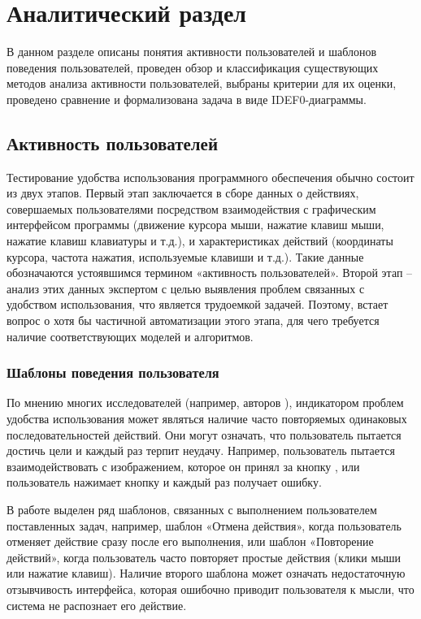 \chapter{Аналитический раздел}
\label{cha:analysis}

В данном разделе
описаны понятия активности пользователей и шаблонов поведения пользователей,
проведен обзор и классификация существующих методов анализа активности пользователей,
выбраны критерии для их оценки, проведено сравнение и формализована задача в виде IDEF0-диаграммы.

\section{Активность пользователей}

Тестирование удобства использования программного обеспечения обычно состоит из двух этапов. Первый этап заключается в сборе данных о действиях, совершаемых пользователями посредством взаимодействия с графическим интерфейсом программы (движение курсора мыши, нажатие клавиш мыши, нажатие клавиш клавиатуры и т.д.), и характеристиках действий (координаты курсора, частота нажатия, используемые клавиши и т.д.). Такие данные обозначаются устоявшимся термином «активность пользователей». Второй этап – анализ этих данных экспертом с целью выявления проблем связанных с удобством использования, что является трудоемкой задачей. Поэтому, встает вопрос о хотя бы частичной автоматизации этого этапа, для чего требуется наличие соответствующих моделей и алгоритмов.

\subsection{Шаблоны поведения пользователя}
По мнению многих исследователей (например, авторов \cite{1,4,5,6}), индикатором проблем удобства использования может являться наличие часто повторяемых одинаковых последовательностей действий. Они могут означать, что пользователь пытается достичь цели и каждый раз терпит неудачу. Например, пользователь пытается взаимодействовать с изображением, которое он принял за кнопку \cite{1}, или пользователь нажимает кнопку и каждый раз получает ошибку.

В работе \cite{4} выделен ряд шаблонов, связанных с выполнением пользователем поставленных задач, например, шаблон «Отмена действия», когда пользователь отменяет действие сразу после его выполнения, или шаблон «Повторение действий», когда пользователь часто повторяет простые действия (клики мыши или нажатие клавиш). Наличие второго шаблона может означать недостаточную отзывчивость интерфейса, которая ошибочно приводит пользователя к мысли, что система не распознает его действие.

